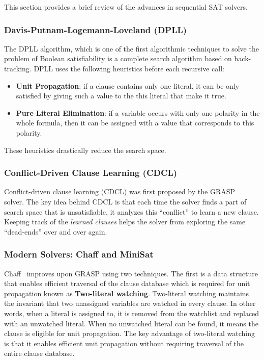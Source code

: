 \documentclass[letterpaper, compsoc, conference]{IEEEtran}
\begin{document}
This section provides a brief review of the advances in sequential SAT solvers.

\subsubsection{Davis-Putnam-Logemann-Loveland (DPLL)}

The DPLL algorithm, which is one of the first algorithmic techniques to solve
the problem of Boolean satisfiability is a complete search algorithm based on
back-tracking. DPLL uses the following heuristics before each recursive call:

\begin{itemize}
\item \textbf{Unit Propagation}: if a clause contains only one literal, it can
be only satisfied by giving such a value to the this literal that make it true. 

\item \textbf{Pure Literal Elimination}: if a variable occurs with only one
polarity in the whole formula, then it can be assigned with a value that
corresponds to this polarity.
\end{itemize}
These heuristics drastically reduce the search space.

\subsubsection{Conflict-Driven Clause Learning (CDCL)}

Conflict-driven clause learning (CDCL) was first proposed by the
GRASP~\cite{GRASP} solver. The key idea behind CDCL is that each time the
solver finds a part of search space that is unsatisfiable, it analyzes this
``conflict'' to learn a new clause. Keeping track of the \emph{learned clauses}
helps the solver from exploring the same ``dead-ends'' over and over again.

\subsubsection{Modern Solvers: Chaff and MiniSat} 
Chaff~\cite{CHAFF} improves upon GRASP using two techniques.  The first is a
data structure that enables efficient traversal of the clause database which is
required for unit propagation known as \textbf{Two-literal watching}.
Two-literal watching maintains the invariant that two unassigned variables are
watched in every clause. In other words, when a literal is assigned to, it is
removed from the watchlist and replaced with an unwatched literal. When no
unwatched literal can be found, it means the clause is eligible for unit
propagation. The key advantage of two-literal watching is that it enables
efficient unit propagation without requiring traversal of the entire clause
database.
\end{document}
